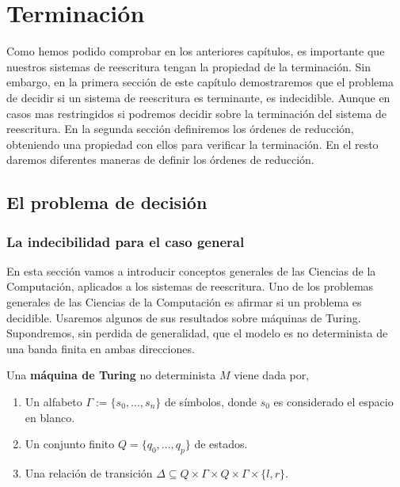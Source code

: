 \chapter{Terminación} \label{cap:term}

Como hemos podido comprobar en los anteriores capítulos, es importante
que nuestros sistemas de reescritura tengan la propiedad de la
terminación. Sin embargo, en la primera sección de este capítulo
demostraremos que el problema de decidir si un sistema de reescritura
es terminante, es indecidible. Aunque en casos mas restringidos si
podremos decidir sobre la terminación del sistema de reescritura. En
la segunda sección definiremos los órdenes de reducción, obteniendo
una propiedad con ellos para verificar la terminación. En el resto
daremos diferentes maneras de definir los órdenes de reducción.

\section{El problema de decisión}

\subsection{La indecibilidad para el caso general}

En esta sección vamos a introducir conceptos generales de las Ciencias
de la Computación, aplicados a los sistemas de reescritura. Uno de los
problemas generales de las Ciencias de la Computación es afirmar si un
problema es decidible. Usaremos algunos de sus resultados sobre
máquinas de Turing. Supondremos, sin perdida de generalidad, que el
modelo es no determinista de una banda finita en ambas direcciones.

\begin{defi} 
  Una \textbf{máquina de Turing} no determinista $M$ viene dada por,
  \begin{enumerate}
  \item Un alfabeto $\Gamma := \{s_0, \dots, s_n \}$ de símbolos,
    donde $s_0$ es considerado el espacio en blanco.
  \item Un conjunto finito $Q = \{q_0, \dots, q_p \}$ de estados.
  \item Una relación de transición
    $\Delta \subseteq Q \times \Gamma \times Q \times \Gamma \times \{
    l,r \} $.
  \end{enumerate}
\end{defi}

